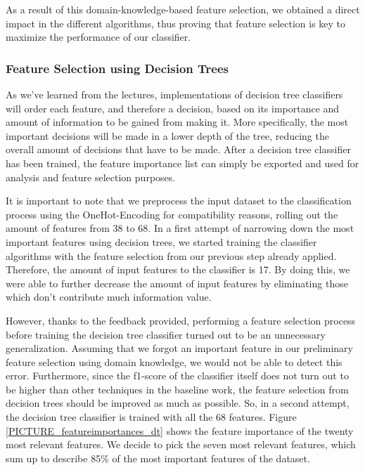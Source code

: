 As a result of this domain-knowledge-based feature selection, we obtained a direct impact in the different algorithms, thus proving that feature selection is key to maximize the performance of our classifier.

\subsubsection{Feature Selection using Decision Trees}
\label{SUBSUBSECTION_FeatureSelectionDTs}

As we’ve learned from the lectures, implementations of decision tree classifiers will order each feature, and therefore a decision, based on its importance and amount of information to be gained from making it. More specifically, the most important decisions will be made in a lower depth of the tree, reducing the overall amount of decisions that have to be made. After a decision tree classifier has been trained, the feature importance list can simply be exported and used for analysis and feature selection purposes.

It is important to note that we preprocess the input dataset to the classification process using the OneHot-Encoding for compatibility reasons, rolling out the amount of features from 38 to 68. In a first attempt of narrowing down the most important features using decision trees, we started training the classifier algorithms with the feature selection from our previous step already applied. Therefore, the amount of input features to the classifier is 17. By doing this, we were able to further decrease the amount of input features by eliminating those which don’t contribute much information value.

However, thanks to the feedback provided, performing a feature selection process before training the decision tree classifier turned out to be an unnecessary generalization. Assuming that we forgot an important feature in our preliminary feature selection using domain knowledge, we would not be able to detect this error. Furthermore, since the f1-score of the classifier itself does not turn out to be higher than other techniques in the baseline work, the feature selection from decision trees should be improved as much as possible. So, in a second attempt, the decision tree classifier is trained with all the 68 features. Figure \ref{PICTURE_featureimportances_dt} shows the feature importance of the twenty most relevant features. We decide to pick the seven most relevant features, which sum up to describe 85\% of the most important features of the dataset.

